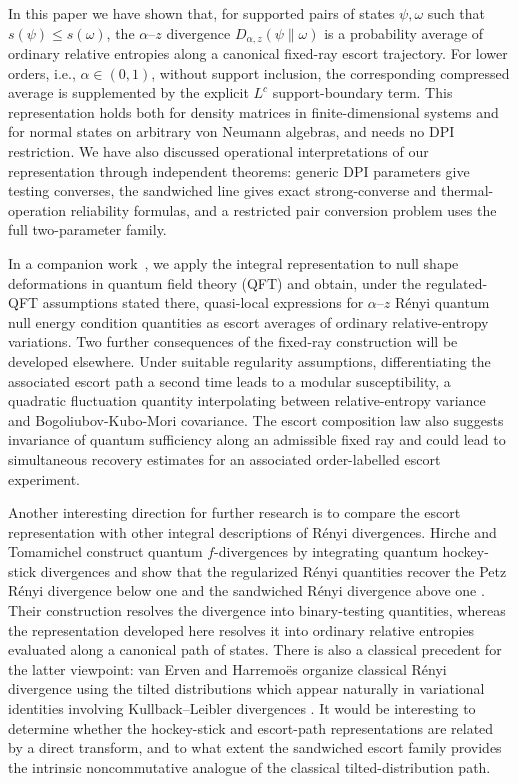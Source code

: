 \documentclass[12pt]{article}
\numberwithin{equation}{section}
\theoremstyle{definition}
\theoremstyle{remark}
\newcommand{\az}{$\alpha$--$z$}
\newcommand{\?}{\overset{?}{=}}
\begin{document}
In this paper we have shown that, for supported pairs of states $\psi,\omega$ such that $s(\psi)\leq s(\omega)$, the {\az} divergence $D_{\alpha,z}(\psi\|\omega)$ is a probability average of ordinary relative entropies along a canonical fixed-ray escort trajectory. For lower orders, i.e., $\alpha\in(0,1)$, without support inclusion, the corresponding compressed average is supplemented by the explicit $L^c$ support-boundary term.
This representation holds both for density matrices in finite-dimensional systems and for normal states on arbitrary von Neumann algebras, and needs no DPI restriction.
We have also discussed operational interpretations of our representation through independent theorems: generic DPI parameters give testing
converses, the sandwiched line gives exact strong-converse and
thermal-operation reliability formulas, and a restricted pair conversion
problem uses the full two-parameter family. 

In a companion work~\cite{Kibe:2026hepth}, we apply the integral representation to null shape deformations in quantum field theory (QFT) and obtain, under the regulated-QFT assumptions stated there, quasi-local expressions for \(\alpha\)--\(z\) R\'enyi quantum null energy condition quantities as escort averages of ordinary relative-entropy variations. 
Two further consequences of the fixed-ray construction will be developed elsewhere. Under suitable regularity assumptions, differentiating the associated escort path a second time leads to a modular susceptibility, a quadratic fluctuation quantity interpolating between relative-entropy variance and Bogoliubov-Kubo-Mori covariance. The escort composition law also suggests invariance of quantum sufficiency along an admissible fixed ray and could lead to simultaneous recovery estimates for an associated order-labelled escort experiment. 



Another interesting direction for further research is to compare the escort representation with other
integral descriptions of R\'enyi divergences.  Hirche and Tomamichel 
construct quantum $f$-divergences by integrating quantum hockey-stick
divergences and show that the regularized R\'enyi quantities recover the
Petz R\'enyi divergence below one and the sandwiched R\'enyi divergence
above one \cite{Hirche:2023caq}.  Their construction resolves the
divergence into binary-testing quantities, whereas the representation
developed here resolves it into ordinary relative entropies evaluated along
a canonical path of states.  There is also a classical precedent for the
latter viewpoint: van Erven and Harremo\"es organize classical R\'enyi
divergence using the tilted distributions
which appear naturally in variational identities involving
Kullback--Leibler divergences \cite{Erven:2014aa}.  It would be
interesting to determine whether the hockey-stick and escort-path
representations are related by a direct transform, and to what extent the
sandwiched escort family provides the intrinsic noncommutative analogue of
the classical tilted-distribution path.
\end{document}
